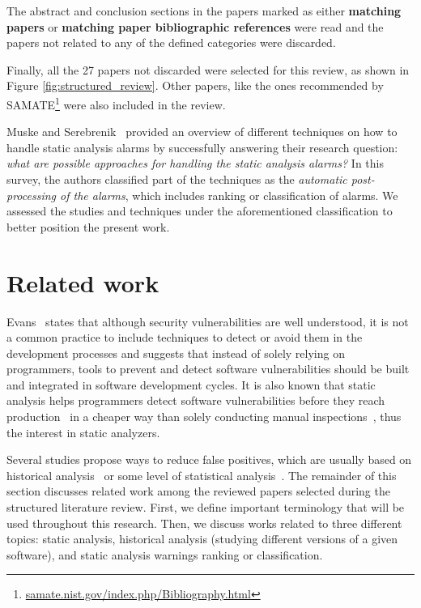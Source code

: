 The abstract and conclusion sections in the papers marked as either
\textbf{matching papers} or \textbf{matching paper bibliographic references} were read and the
papers not related to any of the defined categories were discarded.

Finally, all the 27 papers not discarded were selected for this review, as
shown in Figure \ref{fig:structured_review}.  Other papers, like the ones
recommended by
SAMATE\footnote{\url{samate.nist.gov/index.php/Bibliography.html}} were also
included in the review. 


Muske and Serebrenik~\cite{muske2016survey} provided an overview of different
techniques on how to handle static analysis alarms by successfully answering
their research question: \textit{what are possible approaches for handling the
static analysis alarms?} In this survey, the authors classified part of the
techniques as the \textit{automatic post-processing of the alarms}, which
includes ranking or classification of alarms. We assessed the studies and
techniques under the aforementioned classification to better position the
present work.

\section{Related work}
\label{sec:related_work}

Evans~\cite{evans_improving_2002} states that although security vulnerabilities
are well understood, it is not a common practice to include techniques to detect
or avoid them in the development processes and suggests that instead of solely
relying on programmers, tools to prevent and detect software vulnerabilities
should be built and integrated in software development cycles. It is also
known that static analysis helps programmers detect software vulnerabilities
before they reach production~\cite{evans_improving_2002} in a cheaper way than
solely conducting manual inspections~\cite{johnson_why_2013}, thus the interest
in static analyzers.

Several studies propose ways to reduce false positives, which are usually based
on historical analysis~\cite{penta_evolution_2008, spacco_tracking_2006,
kim_which_2007} or some level of statistical analysis~\cite{muske2013review,
boogerd2006prioritizing, kremenek2003z, ruthruff_predicting_2008}. The
remainder of this section discusses related work among the reviewed papers
selected during the structured literature review. First, we define important terminology
that will be used throughout this research. Then, we discuss works related to
three different topics: static analysis, historical analysis (studying
different versions of a given software), and static analysis warnings ranking
or classification.

